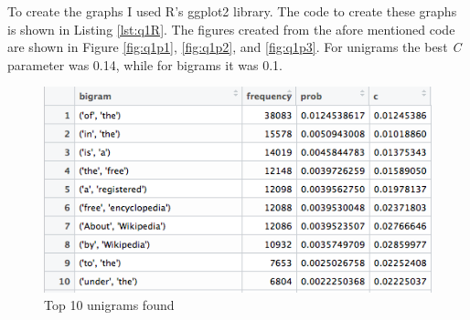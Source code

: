 \documentclass[letterpaper,11pt]{article}
\newcommand*{\srcPath}{../src}%
\begin{document}
 
 
 To create the graphs I used R's ggplot2 library. 
 The code to create these graphs is shown in Listing \ref{lst:q1R}.
 The figures created from the afore mentioned code are shown in Figure \ref{fig:q1p1}, \ref{fig:q1p2}, and \ref{fig:q1p3}.
For unigrams the best \textit{C} parameter was 0.14, while for bigrams it was 0.1.
 
  


  \begin{figure}[h]
  \centering
  \includegraphics[scale=0.6]{unigram_10.png}
  \caption{Top 10 unigrams found}
  \label{fig:q1uni}
  \end{figure}
\end{document}
